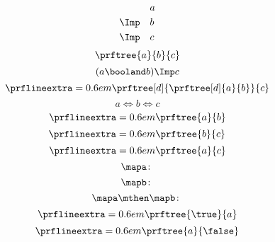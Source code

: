 {\begin{forslides}
\begin{equation}
\begin{aligned}
                       & a \\
            \Imp \quad & b \\
            \Imp \quad & c
        \end{aligned}
    \end{equation}
    \begin{equation}
        \label{eq:abc_3}
        \prftree{a}{b}{c}
    \end{equation}
    \begin{equation}
        \label{eq:abc_4}
        (a\booland b)\Imp c
    \end{equation}
    \begin{equation}
        \label{eq:abc_5}
        \prflineextra=0.6em
        \prftree[d]
        {\prftree[d]
            {a}
            {b}}
        {c}
    \end{equation}
    \begin{equation}
        \label{eq:abc_6}
        a\Leftrightarrow b \Leftrightarrow c
    \end{equation}
    \begin{equation}
        \label{eq:abc_7}
        \prflineextra=0.6em
        \prftree{a}{b}
    \end{equation}
    \begin{equation}
        \label{eq:abc_8}
        \prflineextra=0.6em
        \prftree{b}{c}
    \end{equation}
    \begin{equation}
        \label{eq:abc_9}
        \prflineextra=0.6em
        \prftree{a}{c}
    \end{equation}
    \begin{equation}
        \label{eq:mapf}
        \mapa \colon
    \end{equation}
    \begin{equation}
        \label{eq:mapg}
        \mapb \colon
    \end{equation}
    \begin{equation}
        \label{eq:mapcomp}
        \mapa \mthen \mapb \colon
    \end{equation}
    \begin{equation}
        \label{eq:top1}
        \prflineextra=0.6em
        \prftree{\true}{a}
    \end{equation}
    \begin{equation}
        \label{eq:bot1}
        \prflineextra=0.6em
        \prftree{a}{\false}
    \end{equation}
    \begin{equation}

\end{equation}
\end{forslides}}
